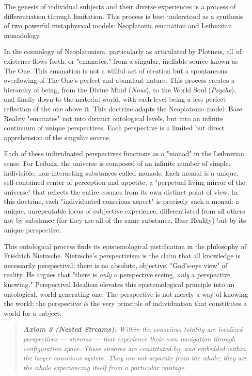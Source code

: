 The genesis of individual subjects and their diverse experiences is a process of differentiation through limitation. This process is best understood as a synthesis of two powerful metaphysical models: Neoplatonic emanation and Leibnizian monadology.


In the cosmology of Neoplatonism, particularly as articulated by Plotinus, all of existence flows forth, or "emanates," from a singular, ineffable source known as The One. This emanation is not a willful act of creation but a spontaneous overflowing of The One's perfect and abundant nature. This process creates a hierarchy of being, from the Divine Mind (\textit{Nous}), to the World Soul (\textit{Psyche}), and finally down to the material world, with each level being a less perfect reflection of the one above it. This doctrine adapts the Neoplatonic model: Base Reality "emanates" not into distinct ontological levels, but into an infinite continuum of unique perspectives. Each perspective is a limited but direct apprehension of the singular source.


Each of these individuated perspectives functions as a "monad" in the Leibnizian sense. For Leibniz, the universe is composed of an infinite number of simple, indivisible, non-interacting substances called monads. Each monad is a unique, self-contained center of perception and appetite, a "perpetual living mirror of the universe" that reflects the entire cosmos from its own distinct point of view. In this doctrine, each "individuated conscious aspect" is precisely such a monad: a unique, unrepeatable locus of subjective experience, differentiated from all others not by substance (for they are all of the same substance, Base Reality) but by its unique perspective.


This ontological process finds its epistemological justification in the philosophy of Friedrich Nietzsche. Nietzsche's perspectivism is the claim that all knowledge is necessarily perspectival; there is no absolute, objective, "God's-eye view" of reality. He argues that "there is \textit{only} a perspective seeing, \textit{only} a perspective knowing." Perspectival Idealism elevates this epistemological principle into an ontological, world-generating one. The perspective is not merely a way of knowing the world; the perspective \textit{is} the very principle of individuation that constitutes a world for a subject.


\begin{quote}
\itshape
\textbf{Axiom 3 (Nested Streams):} \textit{Within the conscious totality are localized perspectives — streams — that experience their own navigation through configuration space. These streams are constituted by, and embedded within, the larger conscious system. They are not separate from the whole; they are the whole experiencing itself from a particular vantage.}
\end{quote}


